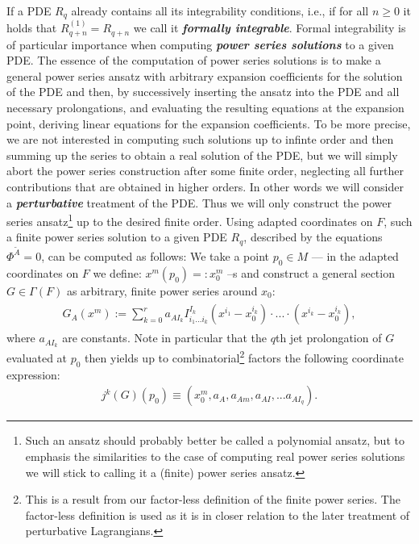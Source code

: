 If a PDE $R_q$ already contains all its integrability conditions, i.e., if for all $n\geq 0$ it holds that $R_{q+n}^{(1)} = R_{q+n}$ we call it \textit{\textbf{formally integrable}}.
Formal integrability is of particular importance when computing \textbf{\textit{power series solutions}} to a given PDE. The essence of the computation of power series solutions is to make a general power series ansatz with arbitrary expansion coefficients for the solution of the PDE and then, by successively inserting the ansatz into the PDE and all necessary prolongations, and evaluating the resulting equations at the expansion point, deriving linear equations for the expansion coefficients. 
To be more precise, we are not interested in computing such solutions up to infinte order and then summing up the series to obtain a real solution of the PDE, but we will simply abort the power series construction after some finite order, neglecting all further contributions that are obtained in higher orders.
In other words we will consider a \textit{\textbf{perturbative}} treatment of the PDE.
Thus we will only construct the power series ansatz\footnote{Such an ansatz should probably better be called a polynomial ansatz, but to emphasis the similarities to the case of computing real power series solutions we will stick to calling it a (finite) power series ansatz.} up to the desired finite order.
Using adapted coordinates on $F$, such a finite power series solution to a given PDE $R_q$, described by the equations $\Phi^{\tilde{A}} = 0$, can be computed as follows: We take a point $p_0 \in M$ --- in the adapted coordinates on $F$ we define: $x^m(p_0) =: x_0^m$ --s and construct a general section $G\in\Gamma(F)$ as arbitrary, finite power series around $x_0$:
\begin{align}
\begin{aligned}
    G_A(x^m) :=  \sum_{k=0}^{r} a_{AI_k}I^{I_k}_{i_1...i_k}(x^{i_1}-x_0^{i_k}) \cdot ... \cdot (x^{i_k}- x_0^{i_k}), 
\end{aligned}
\end{align}
where $a_{AI_k}$ are constants. Note in particular that the $q$th jet prolongation of $G$ evaluated at $p_0$ then yields up to combinatorial\footnote{This is a result from our factor-less definition of the finite power series. The factor-less definition is used as it is in closer relation to the later treatment of perturbative Lagrangians.} factors the following coordinate expression:
\begin{align}
    j^k(G)(p_0) \equiv \left ( x_0^m, a_A, a_{Am}, a_{AI}, ... a_{AI_q} \right ).
\end{align}
